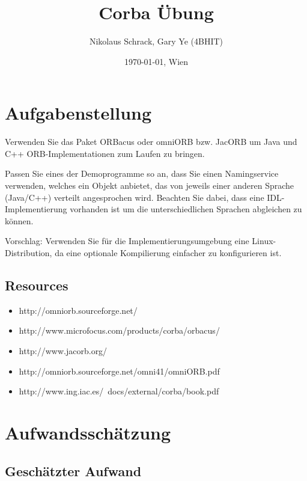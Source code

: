 \documentclass[11pt]{article}
\title{Corba Übung}
\author{Nikolaus Schrack, Gary Ye (4BHIT)}
\date{\today{}, Wien}
\begin{document}
\maketitle
\newpage %
\tableofcontents
\newpage

\lstset{basicstyle=\ttfamily\small,
        keywordstyle=,
        commentstyle=\itshape,
        numbers=left,                   %
        stepnumber=1,
        breaklines=true,					%
        numberstyle=\tiny,
        showstringspaces=false,
        abovecaptionskip=0pt,
        belowcaptionskip=0pt,
        xleftmargin=\parindent,
        fontadjust}

\section{Aufgabenstellung}
Verwenden Sie das Paket ORBacus oder omniORB bzw. JacORB um Java und C++ ORB-Implementationen zum Laufen zu bringen.

Passen Sie eines der Demoprogramme so an, dass Sie einen Namingservice verwenden, welches ein Objekt anbietet, das von jeweils einer anderen Sprache (Java/C++) verteilt angesprochen wird. Beachten Sie dabei, dass eine IDL-Implementierung vorhanden ist um die unterschiedlichen Sprachen abgleichen zu können.

Vorschlag: Verwenden Sie für die Implementierungsumgebung eine Linux-Distribution, da eine optionale Kompilierung einfacher zu konfigurieren ist.

\subsection{Resources}

\begin{itemize}
\item http://omniorb.sourceforge.net/
\item http://www.microfocus.com/products/corba/orbacus/
\item http://www.jacorb.org/
\item http://omniorb.sourceforge.net/omni41/omniORB.pdf
\item http://www.ing.iac.es/~docs/external/corba/book.pdf
\end{itemize}

\section{Aufwandsschätzung}
\subsection{Geschätzter Aufwand}
\end{document}
